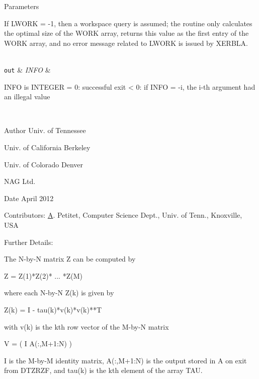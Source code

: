 \begin{DoxyParams}[1]{Parameters}
\begin{DoxyVerb}
          If LWORK = -1, then a workspace query is assumed; the routine
          only calculates the optimal size of the WORK array, returns
          this value as the first entry of the WORK array, and no error
          message related to LWORK is issued by XERBLA.\end{DoxyVerb}
\\
\hline
\mbox{\tt out}  & {\em I\+N\+F\+O} & \begin{DoxyVerb}          INFO is INTEGER
          = 0:  successful exit
          < 0:  if INFO = -i, the i-th argument had an illegal value\end{DoxyVerb}
 \\
\hline
\end{DoxyParams}
\begin{DoxyAuthor}{Author}
Univ. of Tennessee 

Univ. of California Berkeley 

Univ. of Colorado Denver 

N\+A\+G Ltd. 
\end{DoxyAuthor}
\begin{DoxyDate}{Date}
April 2012 
\end{DoxyDate}
\begin{DoxyParagraph}{Contributors\+: }
\hyperlink{classA}{A}. Petitet, Computer Science Dept., Univ. of Tenn., Knoxville, U\+S\+A 
\end{DoxyParagraph}
\begin{DoxyParagraph}{Further Details\+: }
\begin{DoxyVerb}  The N-by-N matrix Z can be computed by

     Z =  Z(1)*Z(2)* ... *Z(M)

  where each N-by-N Z(k) is given by

     Z(k) = I - tau(k)*v(k)*v(k)**T

  with v(k) is the kth row vector of the M-by-N matrix

     V = ( I   A(:,M+1:N) )

  I is the M-by-M identity matrix, A(:,M+1:N) 
  is the output stored in A on exit from DTZRZF,
  and tau(k) is the kth element of the array TAU.\end{DoxyVerb}
 
\end{DoxyParagraph}
